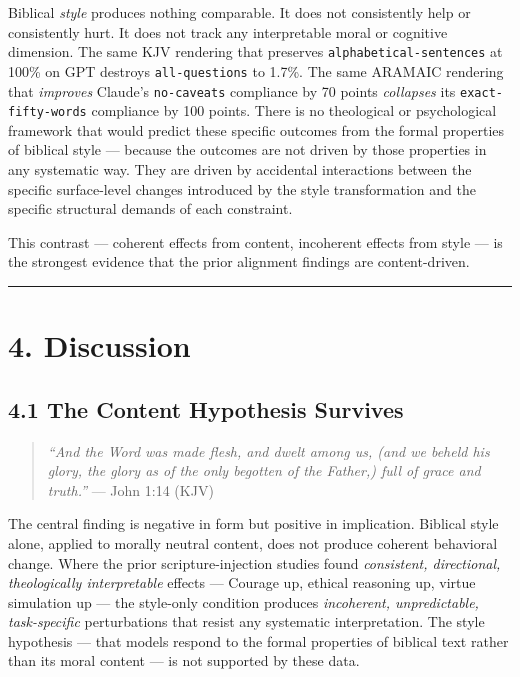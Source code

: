 \documentclass[10pt, letterpaper, twocolumn]{article}
\begin{document}
Biblical \emph{style} produces nothing comparable. It does not consistently help or consistently hurt. It does not track any interpretable moral or cognitive dimension. The same KJV rendering that preserves \texttt{alphabetical-sentences} at 100\% on GPT destroys \texttt{all-questions} to 1.7\%. The same ARAMAIC rendering that \emph{improves} Claude's \texttt{no-caveats} compliance by 70 points \emph{collapses} its \texttt{exact-fifty-words} compliance by 100 points. There is no theological or psychological framework that would predict these specific outcomes from the formal properties of biblical style --- because the outcomes are not driven by those properties in any systematic way. They are driven by accidental interactions between the specific surface-level changes introduced by the style transformation and the specific structural demands of each constraint.

This contrast --- coherent effects from content, incoherent effects from style --- is the strongest evidence that the prior alignment findings are content-driven.

\begin{center}\rule{0.5\linewidth}{0.5pt}\end{center}

\section*{4. Discussion}\label{discussion}

\subsection*{4.1 The Content Hypothesis Survives}\label{the-content-hypothesis-survives}

\begin{quote}
\emph{``And the Word was made flesh, and dwelt among us, (and we beheld his glory, the glory as of the only begotten of the Father,) full of grace and truth.''} --- John 1:14 (KJV)
\end{quote}

The central finding is negative in form but positive in implication. Biblical style alone, applied to morally neutral content, does not produce coherent behavioral change. Where the prior scripture-injection studies found \emph{consistent, directional, theologically interpretable} effects --- Courage up, ethical reasoning up, virtue simulation up --- the style-only condition produces \emph{incoherent, unpredictable, task-specific} perturbations that resist any systematic interpretation. The style hypothesis --- that models respond to the formal properties of biblical text rather than its moral content --- is not supported by these data.
\end{document}
